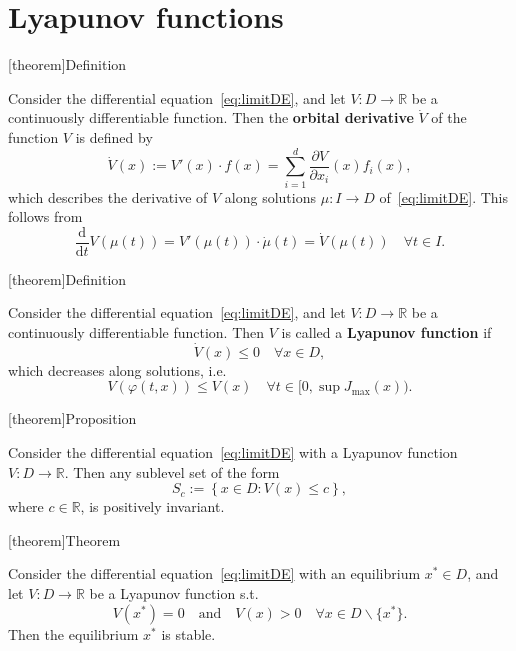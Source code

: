\documentclass[12pt]{report}
\theoremstyle{definition}
\begin{document}
\section{Lyapunov functions}

[theorem]{Definition}
\begin{orbital derivative}
    Consider the differential equation~\eqref{eq:limitDE}, and let
    $V:D\rightarrow\mathbb{R}$ be a continuously differentiable function.
    Then the \textbf{orbital derivative} $\dot{V}$ of the function $V$ is defined by
    \[
        \dot{V}(x):=V'(x)\cdot f(x)
        =\sum_{i=1}^{d} \frac{\partial V}{\partial x_i}(x)f_i(x),
    \]
    which describes the derivative of $V$ along solutions $\mu:I\rightarrow D$
    of~\eqref{eq:limitDE}. This follows from
    \[
        \frac{\mathrm{d}}{\mathrm{d}t}V(\mu(t))=V'(\mu(t))\cdot\dot{\mu}(t)
        = \dot{V}(\mu(t))\quad\forall t\in I.
    \]
\end{orbital derivative}

[theorem]{Definition}
\begin{Lyapunov function}
    Consider the differential equation~\eqref{eq:limitDE}, and let 
    $V:D\rightarrow\mathbb{R}$ be a continuously differentiable function.
    Then $V$ is called a \textbf{Lyapunov function} if
    \[
        \dot{V}(x)\le 0\quad\forall x \in D,
    \]
    which decreases along solutions, i.e.\
    \[
        V(\varphi(t,x))\le V(x)\quad\forall t\in[0,\sup{J_{\text{max}}(x)}).
    \]
\end{Lyapunov function}

[theorem]{Proposition}
\begin{sublevel sets of Lyapunov functions are +ve invariant}
    Consider the differential equation~\eqref{eq:limitDE} with a Lyapunov
    function $V:D\rightarrow\mathbb{R}$. Then any sublevel set of the form
    \[
        S_c:=\left\{x\in D:V(x)\le c\right\},
    \]
    where $c\in\mathbb{R}$, is positively invariant.
\end{sublevel sets of Lyapunov functions are +ve invariant}

[theorem]{Theorem}
\begin{Lyapunov's direct method for stability}
    Consider the differential equation~\eqref{eq:limitDE} with an equilibrium 
    $x^*\in D$, and let $V:D\rightarrow\mathbb{R}$ be a Lyapunov function s.t.
    \[
        V(x^*)=0 \quad\text{and}\quad V(x)>0\quad\forall x\in D\backslash\{x^*\}.
    \]
    Then the equilibrium $x^*$ is stable.
\end{Lyapunov's direct method for stability}
\end{document}
